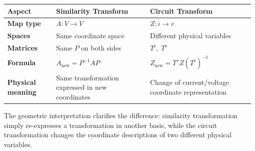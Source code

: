 \begin{table}[h!]
\centering
\renewcommand{\arraystretch}{1.2}
\begin{tabular}{|p{3cm}|p{5.5cm}|p{5.5cm}|}
\hline
\textbf{Aspect} & \textbf{Similarity Transform} & \textbf{Circuit Transform} \\
\hline
\textbf{Map type} & $A : V \to V$ & $Z : i \to v$ \\
\hline
\textbf{Spaces} & Same coordinate space & Different physical variables \\
\hline
\textbf{Matrices} & Same $P$ on both sides & $T^i,\;T^v$ \\
\hline
\textbf{Formula} & $A_{\text{new}} = P^{-1}AP$ & $Z_{\text{new}} = T^v Z (T^i)^{-1}$ \\
\hline
\textbf{Physical meaning} & Same transformation expressed in new coordinates & Change of current/voltage coordinate representation \\
\hline
\end{tabular}
\end{table}

The geometric interpretation clarifies the difference: similarity
transformation simply re-expresses a transformation in another basis,
while the circuit transformation changes the coordinate descriptions of
two different physical variables.